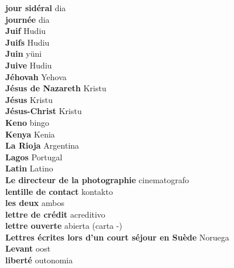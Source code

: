 \textbf{ jour sidéral  } dia \\
\textbf{ journée  } dia \\
\textbf{ Juif  } Hudiu \\
\textbf{ Juifs  } Hudiu \\
\textbf{ Juin  } yüni \\
\textbf{ Juive  } Hudiu \\
\textbf{ Jéhovah  } Yehova \\
\textbf{ Jésus de Nazareth  } Kristu \\
\textbf{ Jésus  } Kristu \\
\textbf{ Jésus-Christ  } Kristu \\
\textbf{ Keno  } bingo \\
\textbf{ Kenya  } Kenia \\
\textbf{ La Rioja  } Argentina \\
\textbf{ Lagos  } Portugal \\
\textbf{ Latin  } Latino \\
\textbf{ Le directeur de la photographie  } cinematografo \\
\textbf{ lentille de contact  } kontakto \\
\textbf{ les deux  } ambos \\
\textbf{ lettre de crédit  } acreditivo \\
\textbf{ lettre ouverte  } abierta (carta -) \\
\textbf{ Lettres écrites lors d’un court séjour en Suède  } Noruega \\
\textbf{ Levant  } oost \\
\textbf{ liberté  } outonomia \\
